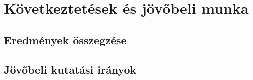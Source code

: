 \chapter{Következtetések és jövőbeli munka}  %

\section{Eredmények összegzése}  %

\section{Jövőbeli kutatási irányok}  %
